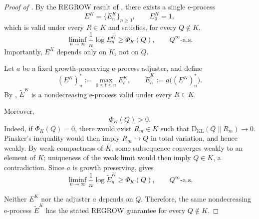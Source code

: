 \documentclass[12pt]{article}
\theoremstyle{spaced}
\theoremstyle{remark}
\newcommand{\KL}{\mathrm{D}_{\text{KL}}}
\begin{document}
\begin{proof}[Proof of ]
By the REGROW result of \citet[Theorem 2]{ram2026power}, there
exists a single e-process
\[
    E^K=\{E_n^K\}_{n\ge0},
    \qquad E_0^K=1,
\]
which is valid under every $R\in K$ and satisfies, for every
$Q\notin K$,
\begin{equation}
\label{eq:ram-ramdas-regrow}
    \liminf_{n\to\infty}
    \frac1n\log E_n^K
    \ge
    \Phi_K(Q),
    \qquad
    Q^\infty\text{-a.s.}
\end{equation}
Importantly, $E^K$ depends only on $K$, not on $Q$.

Let $a$ be a fixed growth-preserving e-process adjuster, and
define
\[
    (E^K)_n^*
    :=
    \max_{0\le t\le n}E_t^K,
    \qquad
    \widetilde E_n^K
    :=
    a\bigl((E^K)_n^*\bigr).
\]
By , $\widetilde E^K$ is a nondecreasing
e-process valid under every $R\in K$.

Moreover, \[ \Phi_K(Q)>0. \] Indeed, if \(\Phi_K(Q)=0\), there would exist \(R_m\in K\) such that \(\KL(Q\|R_m)\to0\). Pinsker's inequality would then imply \(R_m\to Q\) in total variation, and hence weakly. By weak compactness of \(K\), some subsequence converges weakly to an element of \(K\); uniqueness of the weak limit would then imply \(Q\in K\), a contradiction.
Since $a$ is growth preserving,
 gives
\[
    \liminf_{n\to\infty}
    \frac1n\log \widetilde E_n^K
    \ge
    \Phi_K(Q),
    \qquad
    Q^\infty\text{-a.s.}
\]

Neither $E^K$ nor the adjuster $a$ depends on $Q$. Therefore,
the same nondecreasing e-process $\widetilde E^K$ has the stated
REGROW guarantee for every $Q\notin K$.
\end{proof}
\end{document}
